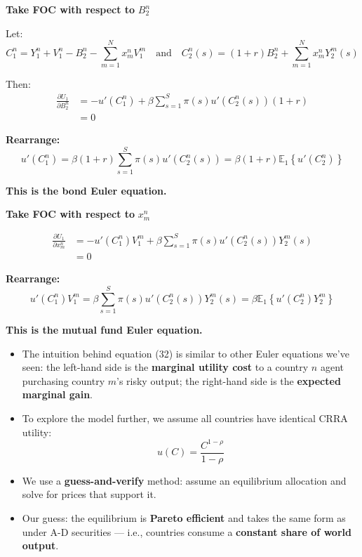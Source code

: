 \documentclass[12pt]{article}
\begin{document}
\begin{itemize}
{\textbf{Take FOC with respect to } \( B_2^n \)

Let:
\[
C_1^n = Y_1^n + V_1^n - B_2^n - \sum_{m=1}^{N} x_m^n V_1^m
\quad \text{and} \quad
C_2^n(s) = (1 + r)B_2^n + \sum_{m=1}^{N} x_m^n Y_2^m(s)
\]

Then:
\begin{align*}
\frac{\partial U_1}{\partial B_2^n}
&= -u'(C_1^n) + \beta \sum_{s=1}^{S} \pi(s) u'(C_2^n(s)) (1 + r) \\
&= 0
\end{align*}

\textbf{Rearrange:}
\[
u'(C_1^n) = \beta (1 + r) \sum_{s=1}^{S} \pi(s) u'(C_2^n(s))
= \beta (1 + r) \mathbb{E}_1 \left\{ u'(C_2^n) \right\}
\]

\textbf{This is the bond Euler equation.}

\textbf{Take FOC with respect to } \( x_m^n \)

\begin{align*}
\frac{\partial U_1}{\partial x_m^n}
&= -u'(C_1^n) V_1^m + \beta \sum_{s=1}^{S} \pi(s) u'(C_2^n(s)) Y_2^m(s) \\
&= 0
\end{align*}

\textbf{Rearrange:}
\[
u'(C_1^n) V_1^m = \beta \sum_{s=1}^{S} \pi(s) u'(C_2^n(s)) Y_2^m(s)
= \beta \mathbb{E}_1 \left\{ u'(C_2^n) Y_2^m \right\}
\]

\textbf{This is the mutual fund Euler equation.}
}

\begin{itemize}
    \item The intuition behind equation (32) is similar to other Euler equations we've seen: the left-hand side is the \textbf{marginal utility cost} to a country \( n \) agent purchasing country \( m \)'s risky output; the right-hand side is the \textbf{expected marginal gain}.
    
    \item To explore the model further, we assume all countries have identical CRRA utility:
    \[
    u(C) = \frac{C^{1 - \rho}}{1 - \rho}
    \]

    \item We use a \textbf{guess-and-verify} method: assume an equilibrium allocation and solve for prices that support it.

    \item Our guess: the equilibrium is \textbf{Pareto efficient} and takes the same form as under A-D securities — i.e., countries consume a \textbf{constant share of world output}.


\end{itemize}
\end{itemize}
\end{document}
